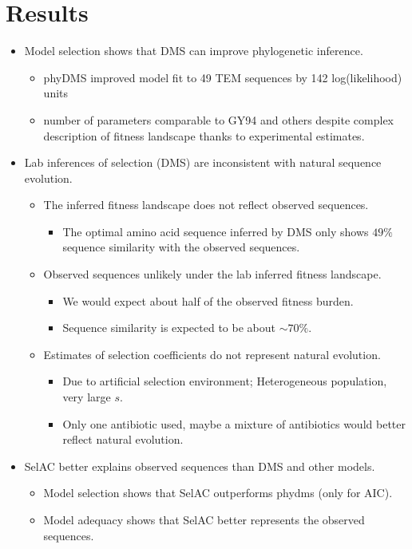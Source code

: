 \documentclass[12pt]{article}
\begin{document}
\section*{Results}

\begin{itemize}
 \item Model selection shows that DMS can improve phylogenetic inference.
 \begin{itemize}
   \item phyDMS improved model fit to 49 TEM sequences by 142 log(likelihood) units
   \item number of parameters comparable to GY94 and others despite complex description of fitness landscape thanks to experimental estimates.
 \end{itemize}
  
  
 \item Lab inferences of selection (DMS) are inconsistent with natural sequence evolution.
 \begin{itemize}
   \item The inferred fitness landscape does not reflect observed sequences.
   \begin{itemize}
    \item The optimal amino acid sequence inferred by DMS only shows $49 \%$ sequence similarity with the observed sequences.
   \end{itemize}
 \item Observed sequences unlikely under the lab inferred fitness landscape.
   \begin{itemize}
    \item We would expect about half of the observed fitness burden.
    \item Sequence similarity is expected to be about $\sim 70 \%$.
   \end{itemize}
 \item Estimates of selection coefficients do not represent natural evolution.
   \begin{itemize}
    \item Due to artificial selection environment; Heterogeneous population, very large $s$. 
    \item Only one antibiotic used, maybe a mixture of antibiotics would better reflect natural evolution.
   \end{itemize}
 \end{itemize}
 
 \item SelAC better explains observed sequences than DMS and other models.
 \begin{itemize}
  \item Model selection shows that SelAC outperforms phydms (only for AIC).
  \item Model adequacy shows that SelAC better represents the observed sequences.
 \end{itemize}
 

\end{itemize}
\end{document}
